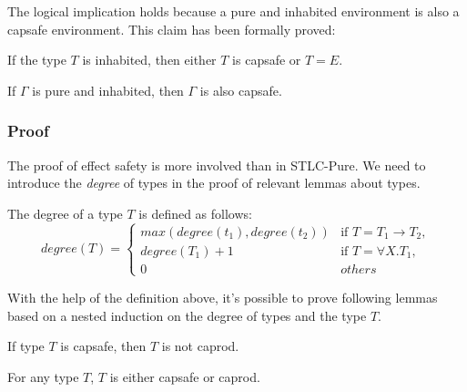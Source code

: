 The logical implication holds because a pure and inhabited
environment is also a capsafe environment. This claim has been
formally proved:

\begin{lemma}
  If the type $T$ is inhabited, then either $T$ is capsafe or $T = E$.
\end{lemma}

\begin{theorem}
  If $\Gamma$ is pure and inhabited, then $\Gamma$ is also capsafe.
\end{theorem}


\subsubsection{Proof}

The proof of effect safety is more involved than in STLC-Pure. We need
to introduce the \emph{degree} of types in the proof of
relevant lemmas about types.

\begin{definition}
  The degree of a type $T$ is defined as follows:
  \begin{equation*}
    degree(T) =
    \begin{cases}
      max(degree(t_1), degree(t_2)) & \text{if } T = T_1 \to T_2,\\
      degree(T_1) + 1 & \text{if } T = \forall X.T_1,\\
      0 & others
    \end{cases}
  \end{equation*}
\end{definition}

With the help of the definition above, it's possible to prove
following lemmas based on a nested induction on the degree of types
and the type $T$.

\begin{lemma}
 If type $T$ is capsafe, then $T$ is not caprod.
\end{lemma}

\begin{lemma}
 For any type $T$, $T$ is either capsafe or caprod.
\end{lemma}

